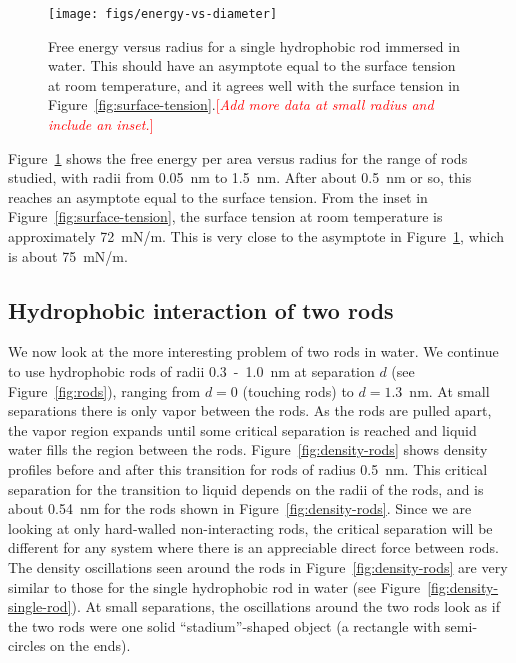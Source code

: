 \documentclass[letterpaper,twocolumn,amsmath,amssymb,prb]{revtex4-1}
\newcommand{\needsworknow}[1]{\textcolor{red}{[\emph{#1}]}}
\begin{document}
\begin{figure}
\begin{center}
\texttt{[image: figs/energy-vs-diameter]}
\end{center}
\caption{ Free energy versus radius for a single hydrophobic rod
immersed in water. This should have an asymptote equal to the surface
tension at room temperature, and it agrees well with the surface tension in
Figure~\ref{fig:surface-tension}.\needsworknow{Add more data at small radius 
and include an inset.} }
\label{fig:energy-vs-diameter}
\end{figure}

Figure~\ref{fig:energy-vs-diameter} shows the free energy per area versus
radius for the range of rods studied, with radii from 0.05~nm to 1.5~nm. After 
about 0.5~nm or so, this reaches
an asymptote equal to the surface tension. From the inset in 
Figure~\ref{fig:surface-tension}, the surface tension at room 
temperature is approximately 72~mN/m. This is very close to the 
asymptote in Figure~\ref{fig:energy-vs-diameter}, which is about 75~mN/m. 

\subsection{Hydrophobic interaction of two rods}

We now look at the more interesting problem of two rods in water. We continue to
use hydrophobic rods of radii 0.3~-~1.0~nm at separation $d$ (see Figure~\ref{fig:rods}), ranging from $d=0$ 
(touching rods) to $d=1.3$~nm. At small
separations there is only vapor between the rods. As the rods are
pulled apart, the vapor region expands until some critical separation is
reached and liquid water fills the region between the rods. Figure~\ref{fig:density-rods} 
shows density profiles before and after this transition
for rods of radius 0.5~nm. This critical separation for the transition to liquid depends
on the radii of the rods, and is about 0.54~nm for the rods shown in 
Figure~\ref{fig:density-rods}. 
Since we are looking at only hard-walled
non-interacting rods, the critical separation will be
different for any system where there is an appreciable direct force between rods. 
The density oscillations seen around the rods in Figure~\ref{fig:density-rods} 
are very similar to
those for the single hydrophobic rod in water (see Figure~\ref{fig:density-single-rod}).
At small separations, the oscillations around the two rods look as if the two rods were one
solid ``stadium''-shaped object (a rectangle with semi-circles on the ends).
\end{document}
